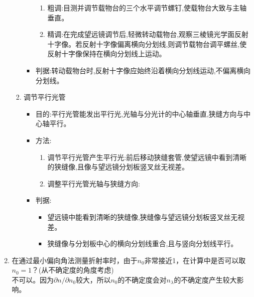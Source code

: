 \documentclass[UTF8]{ctexart}
\begin{document}
\begin{enumerate}
\begin{enumerate}
\begin{itemize}
\begin{enumerate}
                \item 粗调:目测并调节载物台的三个水平调节螺钉,使载物台大致与主轴垂直。
                \item 精调:在完成望远镜调节后,轻微转动载物台,观察三棱镜光学面反射十字像。若反射十字像偏离横向分划线,则调节载物台调平螺丝,使反射十字像保持在横向分划线上运动。
            \end{enumerate}
            \item 判据:转动载物台时,反射十字像应始终沿着横向分划线运动,不偏离横向分划线。
        \end{itemize}
        \item 调节平行光管
        \begin{itemize}
            \item 目的:平行光管能发出平行光,光轴与分光计的中心轴垂直,狭缝方向与中心轴平行。
            \item 方法:
            \begin{enumerate}
                \item 调节平行光管产生平行光:前后移动狭缝套管,使望远镜中看到清晰的狭缝像,且像与望远镜分划板竖叉丝无视差。
                \item 调整平行光管光轴与狭缝方向:
            \end{enumerate}
            \item 判据:
            \begin{itemize}
                \item 望远镜中能看到清晰的狭缝像,狭缝像与望远镜分划板竖叉丝无视差。
                \item 狭缝像与分划板中心的横向分划线重合,且与竖向分划线平行。
            \end{itemize}
        \end{itemize}
    \end{enumerate}
    \item 在通过最小偏向角法测量折射率时，由于\(n_0\)非常接近1，在计算中是否可以取\(n_0 = 1\)？(从不确定度的角度考虑)\\ 不可以。因为\(\partial n / \partial n_0\)较大，所以\(n_0\)的不确定度会对\(n_{\lambda}\)的不确定度产生较大影响。\\
\end{enumerate}
\newpage
\end{document}
